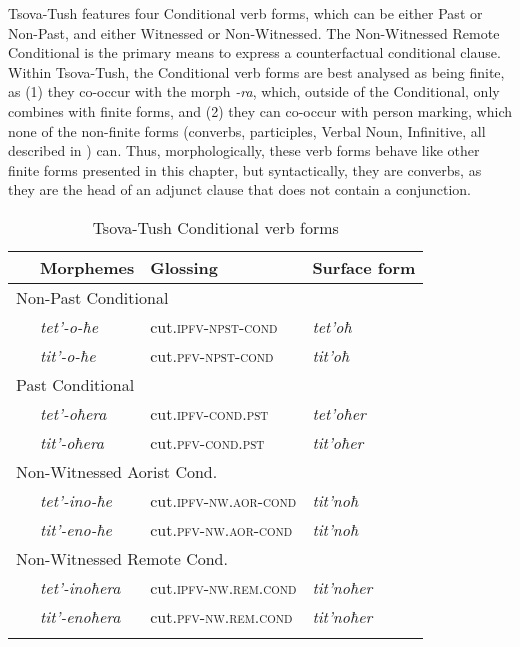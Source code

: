 Tsova-Tush features four Conditional verb forms, which can be either Past or Non-Past, and either Witnessed or Non-Witnessed. The Non-Witnessed Remote Conditional is the primary means to express a counterfactual conditional clause. Within Tsova-Tush, the  Conditional verb forms are best analysed as being finite, as (1) they co-occur with the morph \textit{-ra}, which, outside of the Conditional, only combines with finite forms, and (2) they can co-occur with person marking, which none of the non-finite forms (converbs, participles, Verbal Noun, Infinitive, all described in ) can. Thus, morphologically, these verb forms behave like other finite forms presented in this chapter, but syntactically, they are converbs, as they are the head of an adjunct clause that does not contain a conjunction.

\begin{table}
	\begin{tabular}{llll}
		\lsptoprule
		& {Morphemes} & {Glossing} & {Surface form} \\
		\midrule
		\multicolumn{4}{l}{Non-Past Conditional}\\\
		& \textit{tet'-o-ħe} & cut.\textsc{ipfv-npst-cond} & \textit{tet'oħ} \\
		& \textit{tit'-o-ħe} & cut.\textsc{pfv-npst-cond} & \textit{tit'oħ} \\
		
		\multicolumn{4}{l}{Past Conditional}\\
		& \textit{tet'-oħera} & cut.\textsc{ipfv-cond.pst} & \textit{tet'oħer} \\
		& \textit{tit'-oħera} & cut.\textsc{pfv-cond.pst} & \textit{tit'oħer} \\
		
		\multicolumn{4}{l}{Non-Witnessed Aorist Cond.}\\
		& \textit{tet'-ino-ħe} & cut.\textsc{ipfv-nw.aor-cond} & \textit{tit'noħ} \\
		& \textit{tit'-eno-ħe} & cut.\textsc{pfv-nw.aor-cond} & \textit{tit'noħ} \\
		
		\multicolumn{4}{l}{Non-Witnessed Remote Cond.}\\
		& \textit{tet'-inoħera} & cut.\textsc{ipfv-nw.rem.cond} & \textit{tit'noħer} \\
		& \textit{tit'-enoħera} & cut.\textsc{pfv-nw.rem.cond} & \textit{tit'noħer} \\
		\lspbottomrule
	\end{tabular}
	\caption{Tsova-Tush Conditional verb forms}
	\label{table-condverbflex}
\end{table}

